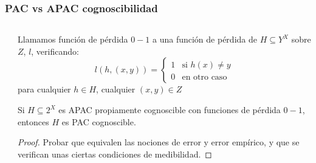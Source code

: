 \begin{frame}\frametitle{PAC vs APAC cognoscibilidad}
 \begin{columns}
  \begin{column}{0.45\textwidth}
  \end{column}
  \begin{column}{0.55\textwidth}
   \begin{definition}
    Llamamos función de pérdida $0-1$ a una función de pérdida de $H\subseteq Y^X$ sobre $Z$, $l$, verificando:
    \[
      l(h, (x,y)) = \left\{\begin{array}{ll}
                            1 & \textrm{si } h(x)\neq y\\
                            0 & \textrm{en otro caso}
                            \end{array}\right.
    \]
    para cualquier $h\in H$, cualquier $(x,y) \in Z$
   \end{definition}
   
   \begin{fact}
    Si $H\subseteq 2^X$ es APAC propiamente cognoscible con funciones de pérdida $0-1$, entonces $H$ es PAC cognoscible.
   \end{fact}
   \begin{proof}
    Probar que equivalen las nociones de error y error empírico, y que se verifican unas ciertas condiciones de medibilidad.
   \end{proof}
  \end{column}
 \end{columns}
\end{frame}

